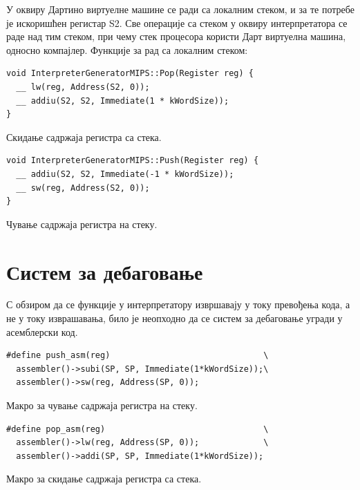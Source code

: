 \documentclass[12pt,oneside]{memoir}
\begin{document}
У оквиру Дартино виртуелне машине се ради са локалним стеком, и за те потребе је искоришћен регистар S2. Све операције са стеком у оквиру интерпретатора се раде над тим стеком, при чему стек процесора користи Дарт виртуелна машина, односно компајлер.
Функције за рад са локалним стеком:\\

\begin{verbatim}
void InterpreterGeneratorMIPS::Pop(Register reg) {
  __ lw(reg, Address(S2, 0));
  __ addiu(S2, S2, Immediate(1 * kWordSize));
}
\end{verbatim}
Скидање садржаја регистра са стека.

\begin{verbatim}
void InterpreterGeneratorMIPS::Push(Register reg) {
  __ addiu(S2, S2, Immediate(-1 * kWordSize));
  __ sw(reg, Address(S2, 0));
}
\end{verbatim}
Чување садржаја регистра на стеку.

\section{Систем за дебаговање}
\label{sec:debagovanje}

С обзиром да се функције у интерпретатору извршавају у току превођења кода, а не у току изврашавања, било је неопходно да се систем за дебаговање угради у асемблерски код.\\

\begin{verbatim}
#define push_asm(reg)                               \
  assembler()->subi(SP, SP, Immediate(1*kWordSize));\
  assembler()->sw(reg, Address(SP, 0));
\end{verbatim}
Макро за чување садржаја регистра на стеку.\\

\begin{verbatim}
#define pop_asm(reg)                                \
  assembler()->lw(reg, Address(SP, 0));             \
  assembler()->addi(SP, SP, Immediate(1*kWordSize));
\end{verbatim}
Макро за скидање садржаја регистра са стека.\\
\end{document}

